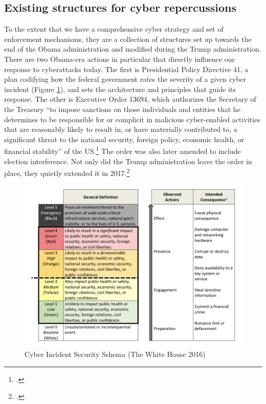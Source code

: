 \documentclass{report}
\begin{document}
\begin{refsegment}
\subsection{Existing structures for cyber repercussions}
To the extent that we have a comprehensive cyber strategy and set of enforcement mechanisms, they are a collection of structures set up towards the end of the Obama administration and modified during the Trump administration. There are two Obama-era actions in particular that directly influence our response to cyberattacks today.
The first is Presidential Policy Directive 41, a plan codifying how the federal government rates the severity of a given cyber incident (Figure \ref{severity-schema}), and sets the architecture and principles that guide its response. The other is Executive Order 13694, which authorizes the Secretary of the Treasury ``to impose sanctions on those individuals and entities that he determines to be responsible for or complicit in malicious cyber-enabled activities that are reasonably likely to result in, or have materially contributed to, a significant threat to the national security, foreign policy, economic health, or financial stability'' of the US.\footcite{daniel_our_2015} The order was also later amended to include election interference. Not only did the Trump administration leave the order in place, they quietly extended it in 2017.\footcite{uchill_white_2017}

\begin{figure}
\centering
\includegraphics[scale=0.53]{severity-schema.png}
\caption{Cyber Incident Security Schema (The White House 2016)}
\label{severity-schema}
\end{figure}


\end{refsegment}
\end{document}
